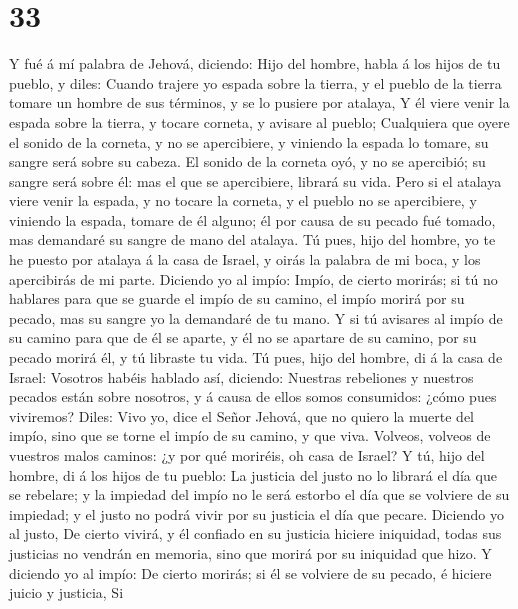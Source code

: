 \hypertarget{section-32}{%
\section{33}\label{section-32}}

 Y fué á mí palabra de Jehová, diciendo:  Hijo
del hombre, habla á los hijos de tu pueblo, y diles: Cuando trajere yo
espada sobre la tierra, y el pueblo de la tierra tomare un hombre de sus
términos, y se lo pusiere por atalaya,  Y él viere venir la
espada sobre la tierra, y tocare corneta, y avisare al pueblo;
 Cualquiera que oyere el sonido de la corneta, y no se
apercibiere, y viniendo la espada lo tomare, su sangre será sobre su
cabeza.  El sonido de la corneta oyó, y no se apercibió; su
sangre será sobre él: mas el que se apercibiere, librará su vida.
 Pero si el atalaya viere venir la espada, y no tocare la
corneta, y el pueblo no se apercibiere, y viniendo la espada, tomare de
él alguno; él por causa de su pecado fué tomado, mas demandaré su sangre
de mano del atalaya.  Tú pues, hijo del hombre, yo te he
puesto por atalaya á la casa de Israel, y oirás la palabra de mi boca, y
los apercibirás de mi parte.  Diciendo yo al impío: Impío,
de cierto morirás; si tú no hablares para que se guarde el impío de su
camino, el impío morirá por su pecado, mas su sangre yo la demandaré de
tu mano.  Y si tú avisares al impío de su camino para que de
él se aparte, y él no se apartare de su camino, por su pecado morirá él,
y tú libraste tu vida.  Tú pues, hijo del hombre, di á la
casa de Israel: Vosotros habéis hablado así, diciendo: Nuestras
rebeliones y nuestros pecados están sobre nosotros, y á causa de ellos
somos consumidos: ¿cómo pues viviremos?  Diles: Vivo yo,
dice el Señor Jehová, que no quiero la muerte del impío, sino que se
torne el impío de su camino, y que viva. Volveos, volveos de vuestros
malos caminos: ¿y por qué moriréis, oh casa de Israel?  Y
tú, hijo del hombre, di á los hijos de tu pueblo: La justicia del justo
no lo librará el día que se rebelare; y la impiedad del impío no le será
estorbo el día que se volviere de su impiedad; y el justo no podrá vivir
por su justicia el día que pecare.  Diciendo yo al justo,
De cierto vivirá, y él confiado en su justicia hiciere iniquidad, todas
sus justicias no vendrán en memoria, sino que morirá por su iniquidad
que hizo.  Y diciendo yo al impío: De cierto morirás; si él
se volviere de su pecado, é hiciere juicio y justicia,  Si
